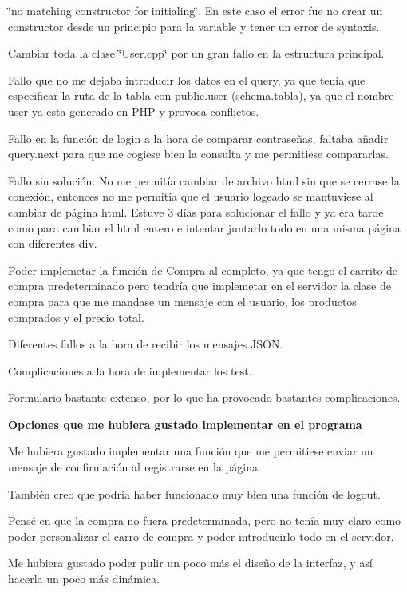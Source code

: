 \begin{DoxyItemize}
\item \char`\"{}no matching constructor for initialing\char`\"{}. En este caso el error fue no crear un constructor desde un principio para la variable y tener un error de syntaxis.
\item Cambiar toda la clase \char`\"{}\+User.\+cpp\char`\"{} por un gran fallo en la estructura principal.
\item Fallo que no me dejaba introducir los datos en el query, ya que tenía que especificar la ruta de la tabla con public.\+user (schema.\+tabla), ya que el nombre user ya esta generado en P\+HP y provoca conflictos.
\item Fallo en la función de login a la hora de comparar contraseñas, faltaba añadir query.\+next para que me cogiese bien la consulta y me permitiese compararlas.
\item Fallo sin solución\+: No me permitía cambiar de archivo html sin que se cerrase la conexión, entonces no me permitía que el usuario logeado se mantuviese al cambiar de página html. Estuve 3 días para solucionar el fallo y ya era tarde como para cambiar el html entero e intentar juntarlo todo en una misma página con diferentes div.
\item Poder implemetar la función de Compra al completo, ya que tengo el carrito de compra predeterminado pero tendría que implemetar en el servidor la clase de compra para que me mandase un mensaje con el usuario, los productos comprados y el precio total.
\item Diferentes fallos a la hora de recibir los mensajes J\+S\+ON.
\item Complicaciones a la hora de implementar los test.
\item Formulario bastante extenso, por lo que ha provocado bastantes complicaciones.
\end{DoxyItemize}

{\bfseries Opciones que me hubiera gustado implementar en el programa}


\begin{DoxyItemize}
\item Me hubiera gustado implementar una función que me permitiese enviar un mensaje de confirmación al registrarse en la página.
\item También creo que podría haber funcionado muy bien una función de logout.
\item Pensé en que la compra no fuera predeterminada, pero no tenía muy claro como poder personalizar el carro de compra y poder introducirlo todo en el servidor.
\item Me hubiera gustado poder pulir un poco más el diseño de la interfaz, y así hacerla un poco más dinámica.
\end{DoxyItemize}





